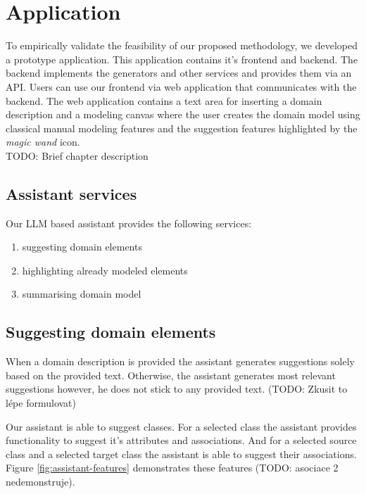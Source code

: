 \section{Application}

To empirically validate the feasibility of our proposed methodology, we developed a prototype application. This application contains it's frontend and backend. The backend  implements the generators and other services and provides them via an API. Users can use our frontend via web application that communicates with the backend. The web application contains a text area for inserting a domain description and a modeling canvas where the user creates the domain model using classical manual modeling features and the suggestion features highlighted by the \textit{magic wand} icon. \\

TODO: Brief chapter description \\

\subsection{Assistant services}

Our LLM based assistant provides the following services:
\begin{enumerate}
\item suggesting domain elements
\item highlighting already modeled elements
\item summarising domain model
\end{enumerate}

\subsection{Suggesting domain elements}

When a domain description is provided the assistant generates suggestions solely based on the provided text. Otherwise, the assistant generates most relevant suggestions however, he does not stick to any provided text. (TODO: Zkusit to lépe formulovat)

Our assistant is able to suggest classes. For a selected class the assistant provides functionality to suggest it's attributes and associations. And for a selected source class and a selected target class the assistant is able to suggest their associations. Figure \ref{fig:assistant-features} demonstrates these features (TODO: asociace 2 nedemonstruje).

